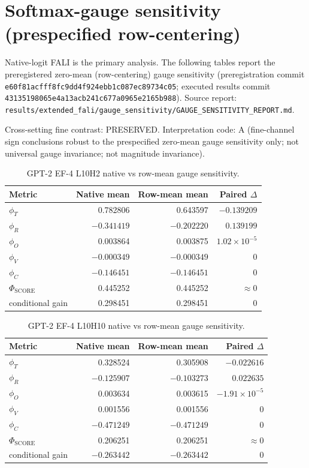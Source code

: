 \documentclass[preprint,12pt,authoryear]{elsarticle}
\begin{document}
\section{Softmax-gauge sensitivity (prespecified row-centering)}

Native-logit FALI is the primary analysis. The following tables report the
preregistered zero-mean (row-centering) gauge sensitivity (preregistration
commit \texttt{e60f81acfff8fc9dd4f924ebb1c087ec89734c05}; executed results
commit \texttt{43135198065e4a13acb241c677a0965e2165b988}). Source report:
\texttt{results/extended\_fali/gauge\_sensitivity/GAUGE\_SENSITIVITY\_REPORT.md}.

Cross-setting fine contrast: PRESERVED. Interpretation code: A
(fine-channel sign conclusions robust to the prespecified zero-mean gauge
sensitivity only; not universal gauge invariance; not magnitude invariance).

\begin{table}[h]
\centering
\caption{GPT-2 EF-4 L10H2 native vs row-mean gauge sensitivity.}
\begin{tabular}{lrrr}
\toprule
Metric & Native mean & Row-mean mean & Paired $\Delta$ \\
\midrule
$\phi_T$ & 0.782806 & 0.643597 & $-0.139209$ \\
$\phi_R$ & $-0.341419$ & $-0.202220$ & $0.139199$ \\
$\phi_O$ & 0.003864 & 0.003875 & $1.02\times10^{-5}$ \\
$\phi_V$ & $-0.000349$ & $-0.000349$ & $0$ \\
$\phi_C$ & $-0.146451$ & $-0.146451$ & $0$ \\
$\Phi_{\mathrm{SCORE}}$ & 0.445252 & 0.445252 & $\approx0$ \\
conditional gain & 0.298451 & 0.298451 & $0$ \\
\bottomrule
\end{tabular}
\end{table}

\begin{table}[h]
\centering
\caption{GPT-2 EF-4 L10H10 native vs row-mean gauge sensitivity.}
\begin{tabular}{lrrr}
\toprule
Metric & Native mean & Row-mean mean & Paired $\Delta$ \\
\midrule
$\phi_T$ & 0.328524 & 0.305908 & $-0.022616$ \\
$\phi_R$ & $-0.125907$ & $-0.103273$ & $0.022635$ \\
$\phi_O$ & 0.003634 & 0.003615 & $-1.91\times10^{-5}$ \\
$\phi_V$ & 0.001556 & 0.001556 & $0$ \\
$\phi_C$ & $-0.471249$ & $-0.471249$ & $0$ \\
$\Phi_{\mathrm{SCORE}}$ & 0.206251 & 0.206251 & $\approx0$ \\
conditional gain & $-0.263442$ & $-0.263442$ & $0$ \\
\bottomrule
\end{tabular}
\end{table}
\end{document}
